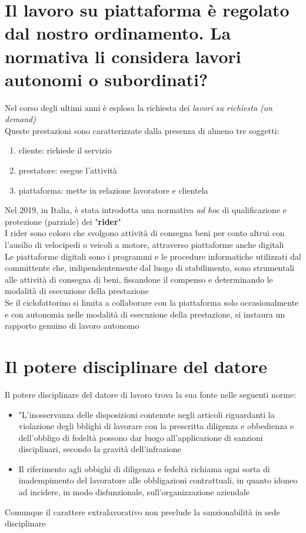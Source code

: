 \documentclass[8pt,oneside,a4paper]{article}
\begin{document}
	\section{Il lavoro su piattaforma è regolato dal nostro ordinamento. La normativa li considera lavori autonomi o subordinati?}
	Nel corso degli ultimi anni è esplosa la richiesta dei \textit{lavori su richiesta (on demand)}\\
	Queste prestazioni sono caratterizzate dalla presenza di almeno tre soggetti:
	\begin{enumerate}
		\item cliente: richiede il servizio
		\item prestatore: esegue l'attività
		\item piattaforma: mette in relazione lavoratore e clientela
	\end{enumerate}
	Nel 2019, in Italia, è stata introdotta una normativa \textit{ad hoc} di qualificazione e protezione (parziale) dei "\textbf{rider}"\\
	I rider sono coloro che svolgono attività di consegna beni per conto altrui con l'ausilio di velocipedi o veicoli a motore, attraverso piattaforme anche digitali\\
	Le piattaforme digitali sono i programmi e le procedure informatiche utilizzati dal committente che, indipendentemente dal luogo di stabilimento, sono strumentali alle attività di consegna di beni, fissandone il compenso e determinando le modalità di esecuzione della prestazione\\
	Se il ciclofattorino si limita a collaborare con la piattaforma solo occasionalmente e con autonomia nelle modalità di esecuzione della prestazione, si instaura un rapporto genuino di lavoro autonomo
	\section{Il potere disciplinare del datore}
	Il potere disciplinare del datore di lavoro trova la sua fonte nelle seguenti norme:
	\begin{itemize}
		\item "L'inosservanza delle disposizioni contenute negli articoli riguardanti la violazione degli bblighi di lavorare con la prescritta diligenza e obbedienza e dell'obbligo di fedeltà possono dar luogo all'applicazione di sanzioni disciplinari, secondo la gravità dell'infrazione
		\item Il riferimento agli obbighi di diligenza e fedeltà richiama ogni sorta di inadempimento del lavoratore alle obbligazioni contrattuali, in quanto idoneo ad incidere, in modo disfunzionale, sull'organizzazione aziendale
	\end{itemize}
	Comunque il carattere extralavorativo non preclude la sanzionabilità in sede disciplinare
\end{document}
